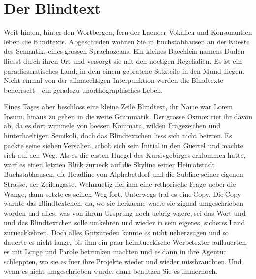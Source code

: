

\chapter{Der Blindtext}


Weit hinten, hinter den Wortbergen, fern der Laender Vokalien und Konsonantien leben die Blindtexte. Abgeschieden wohnen Sie in Buchstabhausen an der Kueste des Semantik, eines grossen Sprachozeans. Ein kleines Baechlein namens Duden fliesst durch ihren Ort und versorgt sie mit den noetigen Regelialien. Es ist ein paradiesmatisches Land, in dem einem gebratene Satzteile in den Mund fliegen. Nicht einmal von der allmaechtigen Interpunktion werden die Blindtexte beherrscht - ein geradezu unorthographisches Leben.

Eines Tages aber beschloss eine kleine Zeile Blindtext, ihr Name war Lorem Ipsum, hinaus zu gehen in die weite Grammatik. Der grosse Oxmox riet ihr davon ab, da es dort wimmele von boesen Kommata, wilden Fragezeichen und hinterhaeltigen Semikoli, doch das Blindtextchen liess sich nicht beirren. Es packte seine sieben Versalien, schob sich sein Initial in den Guertel und machte sich auf den Weg. Als es die ersten Huegel des Kursivgebirges erklommen hatte, warf es einen letzten Blick zurueck auf die Skyline seiner Heimatstadt Buchstabhausen, die Headline von Alphabetdorf und die Subline seiner eigenen Strasse, der Zeilengasse. Wehmuetig lief ihm eine rethorische Frage ueber die Wange, dann setzte es seinen Weg fort.
Unterwegs traf es eine Copy. Die Copy warnte das Blindtextchen, da, wo sie herkaeme waere sie zigmal umgeschrieben worden und alles, was von ihrem Ursprung noch uebrig waere, sei das Wort und und das Blindtextchen solle umkehren und wieder in sein eigenes, sicheres Land zurueckkehren. Doch alles Gutzureden konnte es nicht ueberzeugen und so dauerte es nicht lange, bis ihm ein paar heimtueckische Werbetexter auflauerten, es mit Longe und Parole betrunken machten und es dann in ihre Agentur schleppten, wo sie es fuer ihre Projekte wieder und wieder missbrauchten. Und wenn es nicht umgeschrieben wurde, dann benutzen Sie es immernoch.